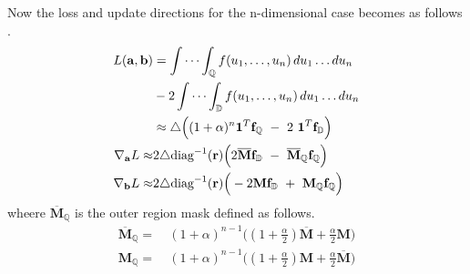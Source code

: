 Now the loss and update directions for the n-dimensional case becomes as follows .
\begin{equation}
\begin{aligned} 
L(\mathbf{a},\mathbf{b}) &= \idotsint_\mathbb{Q} f(u_1,\dots,u_n) \,du_1 \dots du_n \\ 
&- 2 \idotsint_\mathbb{D} f(u_1,\dots,u_n) \,du_1 \dots du_n \\ 
&\approx \triangle\Big((1+\alpha)^{n} \mathbf{1}^{T}\mathbf{f}_{\mathbb{Q}} ~-~ 2 ~ \mathbf{1}^{T}\mathbf{f}_{\mathbb{D}}\Big)\\ 
\nabla_{\mathbf{a}}L  \approx &2\triangle\text{diag}^{-1}(\mathbf{r}) \Big(2\overline{\mathbf{M}}\mathbf{f}_{\mathbb{D}} ~-~ \overline{\mathbf{M}}_{\mathbb{Q}}\mathbf{f}_{\mathbb{Q}}  \Big) \\
\nabla_{\mathbf{b}}L  \approx &2\triangle\text{diag}^{-1}(\mathbf{r}) \Big(-2\mathbf{M}\mathbf{f}_{\mathbb{D}} ~+~ \mathbf{M}_{\mathbb{Q}}\mathbf{f}_{\mathbb{Q}}  \Big)
\label{eq:n-loss-update-outer-sup}
\end{aligned}
\end{equation}
wheere  $\overline{\mathbf{M}}_{\mathbb{Q}}$ is the outer region mask defined as follows. 
\begin{equation}
\begin{aligned} 
\overline{\mathbf{M}}_{\mathbb{Q}} = &~  (1+\alpha)^{n-1}\Big((1+\frac{\alpha}{2})\overline{\mathbf{M}}+\frac{\alpha}{2}\mathbf{M}\Big)\\ 
\mathbf{M}_{\mathbb{Q}} = &~  (1+\alpha)^{n-1}\Big((1+\frac{\alpha}{2})\mathbf{M}+\frac{\alpha}{2}\overline{\mathbf{M}}\Big)
\label{eq:n-mask-outer-sup}
\end{aligned}
\end{equation}



